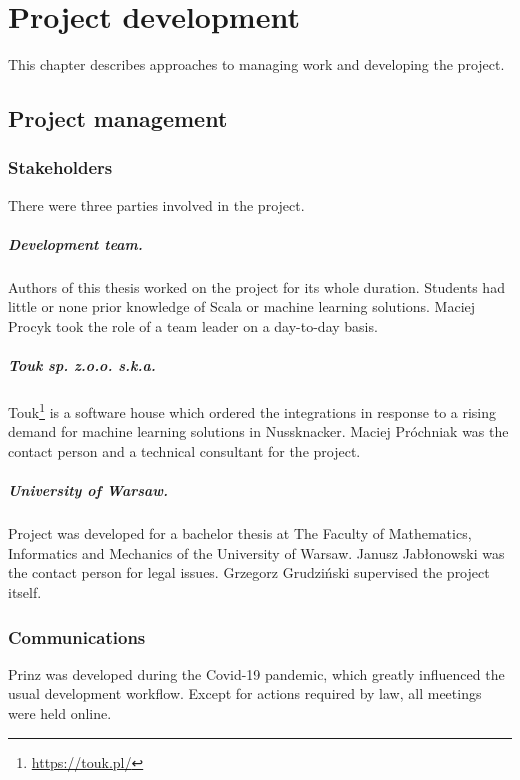\chapter{Project development}
\label{chap:project-development}

This chapter describes approaches to managing work and developing the project.

\section{Project management}

\subsection{Stakeholders}

There were three parties involved in the project.

\paragraph{Development team.}
Authors of this thesis worked on the project for its whole duration.
Students had little or none prior knowledge of Scala or machine learning solutions.
Maciej Procyk took the role of a team leader on a day-to-day basis.

\paragraph{Touk sp. z.o.o. s.k.a.}
Touk\footnote{\href{https://touk.pl/}{https://touk.pl/}} is a software house which ordered the integrations in response to a rising demand for machine learning solutions in Nussknacker.
Maciej Próchniak was the contact person and a technical consultant for the project.

\paragraph{University of Warsaw.}
Project was developed for a bachelor thesis at The Faculty of Mathematics, Informatics and Mechanics of the University of Warsaw.
Janusz Jabłonowski was the contact person for legal issues.
Grzegorz Grudziński supervised the project itself.

\subsection{Communications}

Prinz was developed during the Covid-19 pandemic, which greatly influenced the usual development workflow.
Except for actions required by law, all meetings were held online.

